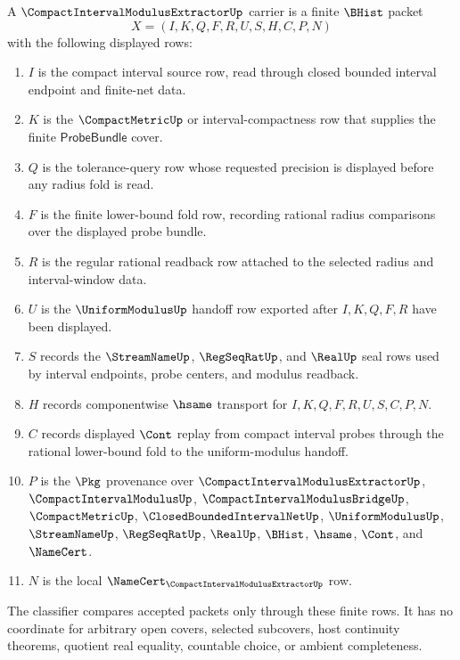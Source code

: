 \begin{definition}
\label{def:compact-interval-modulus-extractor-carrier}
A $\CompactIntervalModulusExtractorUp$ carrier is a finite $\BHist$ packet
$$
X=(I,K,Q,F,R,U,S,H,C,P,N)
$$
with the following displayed rows:
\begin{enumerate}
\item $I$ is the compact interval source row, read through closed bounded interval endpoint and finite-net data.
\item $K$ is the $\CompactMetricUp$ or interval-compactness row that supplies the finite $\mathsf{ProbeBundle}$ cover.
\item $Q$ is the tolerance-query row whose requested precision is displayed before any radius fold is read.
\item $F$ is the finite lower-bound fold row, recording rational radius comparisons over the displayed probe bundle.
\item $R$ is the regular rational readback row attached to the selected radius and interval-window data.
\item $U$ is the $\UniformModulusUp$ handoff row exported after $I,K,Q,F,R$ have been displayed.
\item $S$ records the $\StreamNameUp$, $\RegSeqRatUp$, and $\RealUp$ seal rows used by interval endpoints, probe centers, and modulus readback.
\item $H$ records componentwise $\hsame$ transport for $I,K,Q,F,R,U,S,C,P,N$.
\item $C$ records displayed $\Cont$ replay from compact interval probes through the rational lower-bound fold to the uniform-modulus handoff.
\item $P$ is the $\Pkg$ provenance over $\CompactIntervalModulusExtractorUp$, $\CompactIntervalModulusUp$, $\CompactIntervalModulusBridgeUp$, $\CompactMetricUp$, $\ClosedBoundedIntervalNetUp$, $\UniformModulusUp$, $\StreamNameUp$, $\RegSeqRatUp$, $\RealUp$, $\BHist$, $\hsame$, $\Cont$, and $\NameCert$.
\item $N$ is the local $\NameCert_{\CompactIntervalModulusExtractorUp}$ row.
\end{enumerate}
The classifier compares accepted packets only through these finite rows. It has no coordinate for arbitrary open covers, selected subcovers, host continuity theorems, quotient real equality, countable choice, or ambient completeness.
\end{definition}


